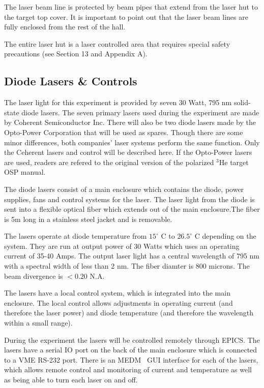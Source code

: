 {The laser beam line is
protected by beam pipes that extend from the laser hut to the target
top cover. It is important to point out that the laser beam lines are
fully enclosed from the rest of the hall.

\begin{safetyen}{10}{5}
The entire laser hut is a laser controlled area that requires special
safety precautions (see Section 13 and Appendix A).
\end{safetyen}

\subsection{Diode Lasers \& Controls}

The laser light for this experiment is provided by seven 30 Watt, 795
nm solid-state diode lasers.  The seven primary lasers used during the
experiment are made by Coherent Semiconductor Inc.  There will also be
two diode lasers made by the Opto-Power Corporation that will be used
as spares.  Though there are some minor differences, both companies'
laser systems perform the same function. Only the Ceherent lasers and
control will be described here. If the Opto-Power lasers are used,
readers are refered to the original version of the polarized $^3$He
target OSP manual.

The diode lasers consist of a main enclosure which contains the diode,
power supplies, fans and control systems for the laser.  The laser
light from the diode is sent into a flexible optical fiber which
extends out of the main enclosure.The fiber is 5m long in a stainless
steel jacket and is removable.

The lasers operate at diode temperature from $15^{\circ}$ C to
$26.5^{\circ}$ C depending on the system.  They are run at output
power of 30 Watts which uses an operating current of 35-40 Amps.  The
output laser light has a central wavelength of 795 nm with a spectral
width of less than 2 nm. The fiber diamter is 800 microns.  The beam
divergence is $< 0.20$ N.A.

The lasers have a local control system, which is integrated into the
main enclosure.  The local control allows adjustments in operating
current (and therefore the laser power) and diode temperature (and
therefore the wavelength within a small range).

During the experiment the lasers will be controlled remotely through
 EPICS.  The lasers have a serial IO port on the back of the main
 enclosure which is connected to a VME RS-232 port.  There is an
 MEDM~\cite{MEDMwww} GUI interface for each of the lasers, which
 allows remote control and monitoring of current and temperature as
 well as being able to turn each laser on and off.


}
